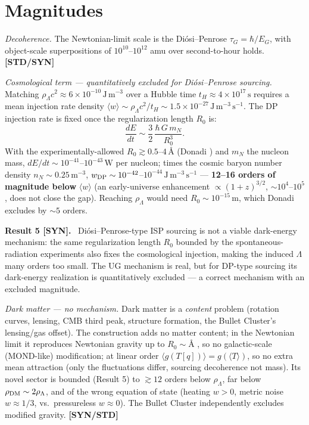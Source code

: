 \documentclass[aps,prd,preprint,amsmath,amssymb,nofootinbib,superscriptaddress]{revtex4-2}
\newenvironment{result}[1]{\par\medskip\noindent\textbf{#1}\ }{\par\medskip}
\begin{document}
\section{Magnitudes}

\emph{Decoherence.} The Newtonian-limit scale is the Di\'osi--Penrose $\tau_G=\hbar/E_G$,
with object-scale superpositions of $10^{10}$--$10^{12}$ amu over second-to-hour holds.
\textbf{[STD/SYN]}

\emph{Cosmological term --- quantitatively excluded for Di\'osi--Penrose sourcing.}
Matching $\rho_\Lambda c^2\approx6\times10^{-10}\,\mathrm{J\,m^{-3}}$ over a Hubble time
$t_H\approx4\times10^{17}\,\mathrm{s}$ requires a mean injection rate density
$\langle w\rangle\sim\rho_\Lambda c^2/t_H\sim1.5\times10^{-27}\,\mathrm{J\,m^{-3}\,s^{-1}}$.
The DP injection rate is fixed once the regularization length $R_0$ is:
\begin{equation}
\frac{dE}{dt}\sim\frac32\,\frac{\hbar\,G\,m_N}{R_0^3}.
\end{equation}
With the experimentally-allowed $R_0\gtrsim0.5$--$4\,\text{\AA}$ (Donadi \cite{Donadi2021})
and $m_N$ the nucleon mass, $dE/dt\sim10^{-41}$--$10^{-43}\,\mathrm{W}$ per nucleon; times
the cosmic baryon number density $n_N\sim0.25\,\mathrm{m^{-3}}$,
$w_{\rm DP}\sim10^{-42}$--$10^{-44}\,\mathrm{J\,m^{-3}\,s^{-1}}$ --- \textbf{12--16 orders of
magnitude below} $\langle w\rangle$ (an early-universe enhancement
$\propto(1+z)^{3/2}$, $\sim10^{4}$--$10^{5}$, does not close the gap). Reaching $\rho_\Lambda$
would need $R_0\sim10^{-15}\,\mathrm{m}$, which Donadi excludes by $\sim5$ orders.

\begin{result}{Result 5 [SYN].}
Di\'osi--Penrose-type ISP sourcing is not a viable dark-energy mechanism: the same
regularization length $R_0$ bounded by the spontaneous-radiation experiments also fixes the
cosmological injection, making the induced $\Lambda$ many orders too small. The UG mechanism
is real, but for DP-type sourcing its dark-energy realization is quantitatively excluded ---
a correct mechanism with an excluded magnitude.
\end{result}

\emph{Dark matter --- no mechanism.} Dark matter is a \emph{content} problem (rotation
curves, lensing, CMB third peak, structure formation, the Bullet Cluster's lensing/gas
offset). The construction adds no matter content; in the Newtonian limit it reproduces
Newtonian gravity up to $R_0\sim\text{\AA}$ \cite{TilloyDiosi2016}, so no galactic-scale
(MOND-like) modification; at linear order $\langle g(T[q])\rangle=g(\langle T\rangle)$, so
no extra mean attraction (only the fluctuations differ, sourcing decoherence not mass). Its
novel sector is bounded (Result 5) to $\gtrsim12$ orders below $\rho_\Lambda$, far below
$\rho_{\rm DM}\sim2\rho_\Lambda$, and of the wrong equation of state (heating $w>0$, metric
noise $w\approx1/3$, vs.\ pressureless $w\approx0$). The Bullet Cluster independently
excludes modified gravity. \textbf{[SYN/STD]}
\end{document}
